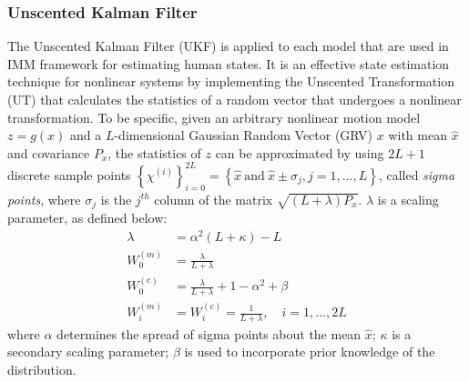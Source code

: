 \documentclass[letterpaper, 10 pt, conference]{ieeeconf}
\begin{document}
	\subsubsection{Unscented Kalman Filter}\label{subsec:UKF}
	The Unscented Kalman Filter (UKF) is applied to each model that are used in IMM framework for estimating human states. 
	It is an effective state estimation technique for nonlinear systems by implementing the Unscented Transformation (UT) that calculates the statistics of a random vector that undergoes a nonlinear transformation\cite {haykin2004kalman}.
	To be specific, given an arbitrary nonlinear motion model $z=g(x)$ and a $L$-dimensional Gaussian Random Vector (GRV) $x$ with mean $\hat{x}$ and covariance $P_x$, the statistics of $z$ can be approximated by using $2L+1$ discrete sample points $\left\{\chi^{(i)} \right\}_{i=0}^{2L}=\left\{ \hat{x}\ \text{and}\  \hat{x} \pm \sigma_j, j=1,...,L\right \}$, called \textit{sigma points}, where $\sigma_j$ is the $j^{th}$ column of the matrix $\sqrt{(L+\lambda)P_x}$. $\lambda$ is a scaling parameter, as defined below:	
	\small	\begin{subequations}
		\begin{align}
			\lambda&=\alpha^2(L+\kappa)-L  \label{eqn:ukf}\\
			W_0^{(m)}&=\frac{\lambda}{L+\lambda}\\
			W_0^{(c)}&=\frac{\lambda}{L+\lambda}+1-\alpha^2+\beta\\
			W_i^{(m)}&=W_i^{(c)}=\frac{1}{L+\lambda},\quad i=1,...,2L 
		\end{align}
	\end{subequations}\normalsize
	where $\alpha$ determines the spread of sigma points about the mean $\hat{x}$; $\kappa$ is a secondary scaling parameter; $\beta$ is used to incorporate prior knowledge of the distribution.	
	
\end{document}
